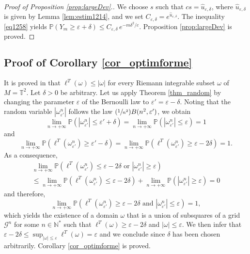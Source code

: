 \documentclass[JEP,XML,SOM,Unicode, NoEqCountersInSection,NoFloatCountersInSection,published]{cedram}
\newcommand{\Psfrac}[2]{(\sfrac{#1}{#2})}
\def\N{\mathbb{N}}
\theoremstyle{definition}
\begin{document}
\begin{proof}[Proof of Proposition \ref{prop:largeDev}.]
We choose $s$ such that $cs=\hat u_{\varepsilon,\delta}$, where $\hat u_{\varepsilon,\delta}$ is given by Lemma \ref{lem:estim1214}, and we set $C_{\varepsilon, \delta}=e^{\hat u_{\varepsilon,\delta}}$. The inequality \eqref{eq1258} yields
$\mathbb{P}( Y_m \geq \varepsilon + \delta) \leq C_{\varepsilon,\delta} \, e^{- m \delta^2/c }$.
Proposition \ref{prop:largeDev} is proved.
\end{proof}

\subsection{Proof of Corollary \ref{cor_optimforme}}\label{sec_proof_cor_optimforme}
It is proved in \cite{HebrardHumbert} that $\ell^T(\omega)\leq |\omega|$ for every Riemann integrable subset $\omega$ of $M=\mathbb{T}^2$. Let $\delta>0$ be arbitrary. Let us apply Theorem \ref{thm_random} by changing the parameter $\varepsilon$ of the Bernoulli law to $\varepsilon'=\varepsilon-\delta$. Noting that the random variable $|\omega_{\varepsilon'}^n|$ follows the law $\Psfrac{1}{n^2}B(n^2,\varepsilon')$, we obtain
\[
\lim_{n\to +\infty}\mathbb{P}(|\omega_{\varepsilon'}^n|\leq \varepsilon'+\delta)=\lim_{n\to +\infty}\mathbb{P}(|\omega_{\varepsilon'}^n|\leq \varepsilon)=1
\]
and
\[
\lim_{n\to +\infty}\mathbb{P}(\ell^T(\omega_{\varepsilon'}^n)\geq \varepsilon'-\delta)=\lim_{n\to +\infty}\mathbb{P}(\ell^T(\omega_{\varepsilon'}^n)\geq \varepsilon-2\delta)=1.
\]
As a consequence,
\begin{multline*}
\lim_{n\to +\infty}\mathbb{P}(\ell^T(\omega_{\varepsilon'}^n)\leq \varepsilon-2\delta\text{ or }|\omega_{\varepsilon'}^n|\geq \varepsilon) \\
\leq \lim_{n\to +\infty}\mathbb{P}(\ell^T(\omega_{\varepsilon'}^n)\leq \varepsilon-2\delta)+ \lim_{n\to +\infty}\mathbb{P}(|\omega_{\varepsilon'}^n|\geq \varepsilon)=0
\end{multline*}
and therefore,
\[
\lim_{n\to +\infty}\mathbb{P}\left(\ell^T(\omega_{\varepsilon'}^n)\geq \varepsilon-2\delta \text{ and } |\omega_{\varepsilon'}^n|\leq \varepsilon\right)=1,
\]
which yields the existence of a domain $\omega$ that is a union of subsquares of a grid~$\mathcal{G}^n$ for some $n\in \N^*$ such that $\ell^T(\omega)\geq \varepsilon-2\delta$ and $|\omega|\leq \varepsilon$. We then infer that $\varepsilon-2\delta\leq \sup_{|\omega| \leq \varepsilon} \ell^T(\omega)= \varepsilon$ and we conclude since $\delta$ has been chosen arbitrarily.
Corollary \ref{cor_optimforme} is proved.
\end{document}
